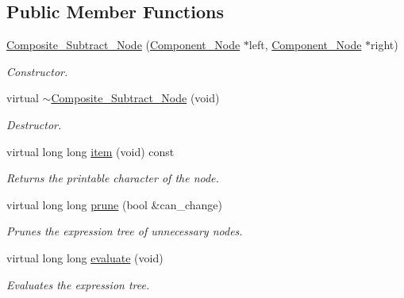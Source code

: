 \subsection*{Public Member Functions}
\begin{DoxyCompactItemize}
\item 
\hyperlink{classMadara_1_1Expression__Tree_1_1Composite__Subtract__Node_a80817a2b73aeb1c253ef3d6396a14fec}{Composite\_\-Subtract\_\-Node} (\hyperlink{classMadara_1_1Expression__Tree_1_1Component__Node}{Component\_\-Node} $\ast$left, \hyperlink{classMadara_1_1Expression__Tree_1_1Component__Node}{Component\_\-Node} $\ast$right)
\begin{DoxyCompactList}\small\item\em Constructor. \item\end{DoxyCompactList}\item 
virtual \hyperlink{classMadara_1_1Expression__Tree_1_1Composite__Subtract__Node_a49f36d917d79ad9db6e431b0f6b783b4}{$\sim$Composite\_\-Subtract\_\-Node} (void)
\begin{DoxyCompactList}\small\item\em Destructor. \item\end{DoxyCompactList}\item 
virtual long long \hyperlink{classMadara_1_1Expression__Tree_1_1Composite__Subtract__Node_a25ed90010dfa8df2d65684bf83ca7a89}{item} (void) const 
\begin{DoxyCompactList}\small\item\em Returns the printable character of the node. \item\end{DoxyCompactList}\item 
virtual long long \hyperlink{classMadara_1_1Expression__Tree_1_1Composite__Subtract__Node_a50a0cc14511b5c33285003b4a4da74f8}{prune} (bool \&can\_\-change)
\begin{DoxyCompactList}\small\item\em Prunes the expression tree of unnecessary nodes. \item\end{DoxyCompactList}\item 
virtual long long \hyperlink{classMadara_1_1Expression__Tree_1_1Composite__Subtract__Node_a5c6ec3403b7f4593d90204ee4c8cb588}{evaluate} (void)
\begin{DoxyCompactList}\small\item\em Evaluates the expression tree. \item\end{DoxyCompactList}\item 

\end{DoxyCompactItemize}
